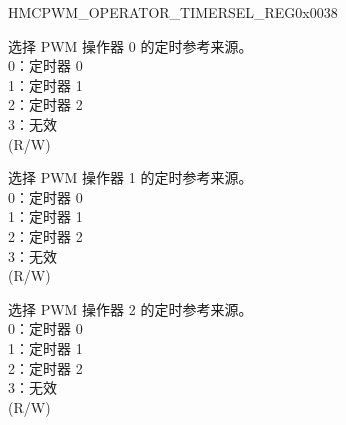 \begin{register}{H}{MCPWM\_OPERATOR\_TIMERSEL\_REG}{0x0038}\label{regdesc:MCPWMOPERATORTIMERSELREG}
%
%
%
%
\regnewline%
\begin{regdesc}\begin{reglist}
\label{fielddesc:MCPWMOPERATOR0TIMERSEL}\item [MCPWM\_OPERATOR0\_TIMERSEL] 选择 PWM 操作器 0 的定时参考来源。\\0：定时器 0\\1：定时器 1\\2：定时器 2\\3：无效\\ (R/W)
\label{fielddesc:MCPWMOPERATOR1TIMERSEL}\item [MCPWM\_OPERATOR1\_TIMERSEL] 选择 PWM 操作器 1 的定时参考来源。\\0：定时器 0\\1：定时器 1\\2：定时器 2\\3：无效\\ (R/W)
\label{fielddesc:MCPWMOPERATOR2TIMERSEL}\item [MCPWM\_OPERATOR2\_TIMERSEL] 选择 PWM 操作器 2 的定时参考来源。\\0：定时器 0\\1：定时器 1\\2：定时器 2\\3：无效\\ (R/W)
\end{reglist}\end{regdesc}
\end{register}


